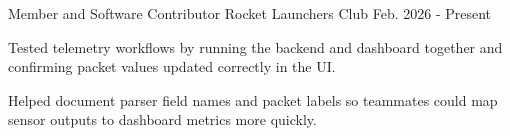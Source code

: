 

\begin{cventries}

  \cventry
    {Member and Software Contributor} %
    {Rocket Launchers Club} %
    {} %
    {Feb. 2026 - Present} %
    {
      \begin{cvitems}
        \item {Tested telemetry workflows by running the backend and dashboard together and confirming packet values updated correctly in the UI.}
        \item {Helped document parser field names and packet labels so teammates could map sensor outputs to dashboard metrics more quickly.}
      \end{cvitems}
    }

\end{cventries}
